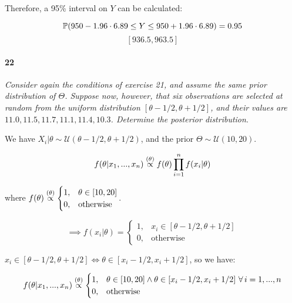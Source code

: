 \documentclass[a4paper]{article}
\begin{document}
                Therefore, a 95\% interval on $Y$ can be calculated:

                \[
                    \mathbb{P}(950 - 1.96 \cdot 6.89 \leq Y \leq 950 + 1.96 \cdot
                    6.89) = 0.95
                \]
                \[
                    [936.5, 963.5]
                \]

            \paragraph{22}
            \textit{Consider again the conditions of exercise 21, and assume the
            same prior distribution of $\Theta$. Suppose now, however, that six
            observations are selected at random from the uniform distribution
            $[\theta - 1/2, \theta + 1/2]$, and their values are $11.0, 11.5,
            11.7, 11.1, 11.4, 10.3$. Determine the posterior distribution}.

                We have $X_i | \theta \sim \mathcal{U}(\theta - 1/2, \theta +
                1/2)$, and the prior $\Theta \sim \mathcal{U}(10, 20)$.

                \[
                    f(\theta | x_1, ..., x_n) \stackrel{({\theta})}{\propto} f(\theta)
                    \prod_{i=1}^n f(x_i | \theta)
                \]

                where $f(\theta) \stackrel{({\theta})}{\propto} \begin{cases}1, & \theta \in
                [10, 20] \\ 0, &\text{otherwise}\end{cases}$.

                \[
                    \implies f(x_i | \theta) = \begin{cases}1, & x_i \in [\theta
                    - 1/2, \theta + 1/2] \\ 0, & \text{otherwise}\end{cases}
                \]

                $x_i \in [\theta - 1/2, \theta + 1/2] \iff \theta \in [x_i -
                1/2, x_i + 1/2]$, so we have:

                \[
                    f(\theta | x_1, ..., x_n) \stackrel{({\theta})}{\propto} \begin{cases}1, &
                    \theta \in [10, 20] \land \theta \in [x_i - 1/2, x_i + 1/2]
                    \,\,\forall\, i = 1, ..., n \\ 0, & \text{otherwise}\end{cases}
                \]
\end{document}

